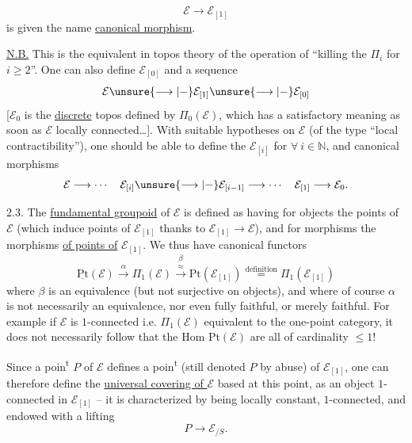 

\[
\mathcal E\longrightarrow\mathcal E_{[1]}
\]
is given the name \uline{canonical morphism}.

\uline{N.B.} This is the equivalent in topos theory of the operation of ``killing the $\Pi_i$ for $i\geq 2$''. One can also define   $\mathcal E_{[0]}$ and a sequence
\[
\mathcal E\unsure{\longrightarrow|-}\mathcal E_{[1]}\unsure{\longrightarrow|-}\mathcal E_{[0]}
\]
[$\mathcal E_0$ is the \uline{discrete} topos defined by $\Pi_0(\mathcal E)$, which has a satisfactory meaning as soon as $\mathcal E$ locally connected\dots]. With suitable hypotheses on $\mathcal E$ (of the type ``local contractibility''), one should be able to define the $\mathcal E_{[i]}$ for $\forall\ i\in\mathbb N$, and canonical morphisms
\[
\mathcal E\longrightarrow\cdots\quad
\mathcal E_{[i]}\unsure{\longrightarrow|-}\mathcal E_{[i-1]}\longrightarrow\cdots\quad
\mathcal E_{[1]}\longrightarrow\mathcal E_0.
\]



2.3. The \uline{fundamental groupoid} of $\mathcal E$ is defined as having for objects the points of $\mathcal E$ (which induce points of $\mathcal E_{[1]}$ thanks to $\mathcal E_{[1]}\longrightarrow\mathcal E$), and for morphisms the  morphisms \uline{of points of} $\mathcal E_{[1]}$. We thus have canonical functors
\[
\underline{\mathrm{Pt}}(\mathcal E)
\xrightarrow{\alpha}\Pi_1(\mathcal E)
\overset{\beta}{\overset{\approx}{\longrightarrow}}
\mathrm{Pt}(\mathcal E_{[1]})
\overset{\text{definition}}{=}\Pi_1(\mathcal E_{[1]})
\]
where $\beta$ is an equivalence (but not surjective on objects), and where of course $\alpha$ is not necessarily an equivalence, nor even fully faithful, or merely faithful. For example if $\mathcal E$ is $1$-connected i.e. $\Pi_1(\mathcal E)$ equivalent to the one-point category, it does not necessarily follow that the Hom  $\mathrm{Pt}(\mathcal E)$ are all of cardinality $\leq 1$!



Since a poin\textsuperscript{t} $P$ of $\mathcal E$ defines a poin\textsuperscript{t} (still denoted $P$ by abuse) of $\mathcal E_{[1]}$, one can therefore define the \uline{universal covering of $\mathcal E$} based at this point, as an object  $1$-connected in $\mathcal E_{[1]}$ -- it is characterized  by being locally constant, $1$-connected, and endowed with a lifting
\[
P\longrightarrow\mathcal E_{/S}.
\]

